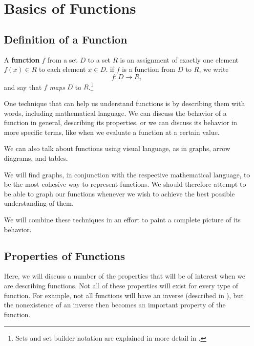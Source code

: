 \chapter{Basics of Functions}
\section{Definition of a Function}

A \textbf{function} \(f\) from a set \(D\) to a set \(R\) is an assignment of exactly one element \(f(x) \in R\) to each element \(x \in D\).
if $f$ is a function from $D$ to $R$, we write
\begin{equation}
  f:D \to R,
  \label{eq:function_definition}
\end{equation}
and say that $f$ \emph{maps} $D$ to $R$.\footnote{Sets and set builder notation are explained in more detail in .}

One technique that can help us understand functions is by describing them with words,
including mathematical language.
We can discuss the behavior of a function in general,
describing its properties, or we can discuss its behavior in more specific terms,
like when we evaluate a function at a certain value.

We can also talk about functions using visual language, as in graphs, arrow diagrams, and tables.

We will find graphs, in conjunction with the respective mathematical language, to be the most cohesive way to represent functions.
We should therefore attempt to be able to graph our functions whenever we wish to achieve the best possible understanding of them.

We will combine these techniques in an effort to paint a complete picture of its behavior.

\section{Properties of Functions}

Here, we will discuss a number of the properties that will be of interest when we are describing functions.
Not all of these properties will exist for every type of function.
For example, not all functions will have an inverse (described in ), but the nonexistence of an inverse then becomes an important property of the function. %

